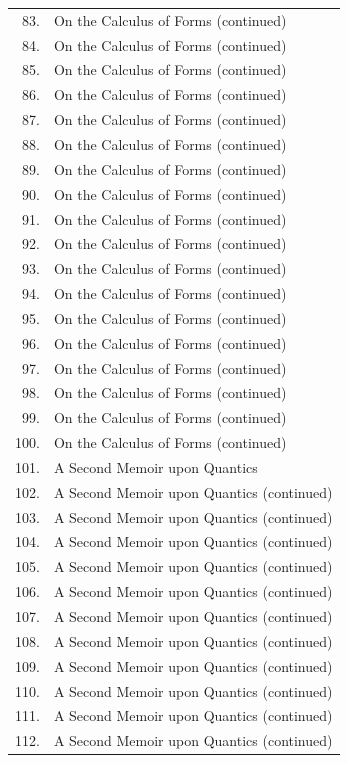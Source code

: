 \documentclass[11pt,a4paper]{book}
\begin{document}
\begin{center}
\begin{longtable}{rp{}}
83. & On the Calculus of Forms (continued) \\
84. & On the Calculus of Forms (continued) \\
85. & On the Calculus of Forms (continued) \\
86. & On the Calculus of Forms (continued) \\
87. & On the Calculus of Forms (continued) \\
88. & On the Calculus of Forms (continued) \\
89. & On the Calculus of Forms (continued) \\
90. & On the Calculus of Forms (continued) \\
91. & On the Calculus of Forms (continued) \\
92. & On the Calculus of Forms (continued) \\
93. & On the Calculus of Forms (continued) \\
94. & On the Calculus of Forms (continued) \\
95. & On the Calculus of Forms (continued) \\
96. & On the Calculus of Forms (continued) \\
97. & On the Calculus of Forms (continued) \\
98. & On the Calculus of Forms (continued) \\
99. & On the Calculus of Forms (continued) \\
100. & On the Calculus of Forms (continued) \\
101. & A Second Memoir upon Quantics \\
102. & A Second Memoir upon Quantics (continued) \\
103. & A Second Memoir upon Quantics (continued) \\
104. & A Second Memoir upon Quantics (continued) \\
105. & A Second Memoir upon Quantics (continued) \\
106. & A Second Memoir upon Quantics (continued) \\
107. & A Second Memoir upon Quantics (continued) \\
108. & A Second Memoir upon Quantics (continued) \\
109. & A Second Memoir upon Quantics (continued) \\
110. & A Second Memoir upon Quantics (continued) \\
111. & A Second Memoir upon Quantics (continued) \\
112. & A Second Memoir upon Quantics (continued) \\

\end{longtable}
\end{center}
\end{document}
